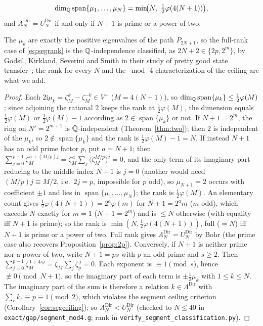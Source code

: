 \begin{theorem}\label{thm:segrank}
\begin{equation}\label{eq:segrank}
  \dim_\Q\operatorname{span}\{\mu_1,\dots,\mu_N\}=\min\!\bigl(N,\ \tfrac12\varphi(4(N+1))\bigr),
\end{equation}
and $A_N^{\mathrm{Dir}}=U_N^{\mathrm{Dir}}$ if and only if $N+1$ is prime or a power of two.
\end{theorem}

\noindent The $\mu_k$ are exactly the positive eigenvalues of the path $P_{2N+1}$, so the full-rank case of
\eqref{eq:segrank} is the $\mathbb{Q}$-independence classified, as $2N+2\in\{2p,2^m\}$, by Godsil, Kirkland, Severini and
Smith in their study of pretty good state transfer~\cite{GKSS12}; the rank for every $N$ and the $\bmod\,4$
characterization of the ceiling are what we add.

\begin{proof}
Each $2\mathrm i\mu_k=\zeta_M^k-\zeta_M^{-k}\in V^-$ ($M=4(N+1)$), so $\dim_{\mathbb{Q}}\operatorname{span}\{\mu_k\}\le\tfrac12\varphi(M)$;
since adjoining the rational $2$ keeps the rank at $\tfrac12\varphi(M)$, the dimension equals
$\tfrac12\varphi(M)$ or $\tfrac12\varphi(M)-1$ according as $2\in\operatorname{span}\{\mu_k\}$ or not.
If $N+1=2^m$, the ring on $N'=2^{m+1}$ is $\mathbb{Q}$-independent (Theorem~\ref{thm:two}); then $2$ is independent
of the $\mu_k$, so $2\notin\operatorname{span}\{\mu_k\}$ and the rank is $\tfrac12\varphi(M)-1=N$. If instead
$N+1$ has an odd prime factor $p$, put $a=N+1$; then
$\sum_{j=0}^{p-1}\zeta_M^{\,a+(M/p)j}=\zeta_M^{\,a}\sum_j\bigl(\zeta_M^{M/p}\bigr)^{j}=0$, and the only term of
its imaginary part reducing to the middle index $N+1$ is $j=0$ (another would need $(M/p)j\equiv M/2$, i.e.\
$2j=p$, impossible for $p$ odd), so $\mu_{N+1}=2$ occurs with coefficient $\pm1$ and lies in
$\operatorname{span}\{\mu_1,\dots,\mu_N\}$; the rank is $\tfrac12\varphi(M)$. An elementary count gives
$\tfrac12\varphi(4(N+1))=2^a\varphi(m)$ for $N+1=2^am$ ($m$ odd), which exceeds $N$ exactly for $m=1$
($N+1=2^m$) and is $\le N$ otherwise (with equality iff $N+1$ is prime); so the rank is
$\min(N,\tfrac12\varphi(4(N+1)))$, full ($=N$) iff $N+1$ is prime or a power of two. Full rank gives
$A_N^{\mathrm{Dir}}=U_N^{\mathrm{Dir}}$ by Bohr (the prime case also recovers Proposition~\ref{prop:2p}).
Conversely, if $N+1$ is neither prime nor a power of two, write $N+1=ps$ with $p$ an odd prime and $s\ge2$.
Then $\sum_{j=0}^{p-1}\zeta_M^{\,1+4sj}=\zeta_M\sum_j\zeta_p^{\,j}=0$. Each exponent is $\equiv1\pmod s$, hence
$\not\equiv0\pmod{N+1}$, so the imaginary part of each term is $\pm\tfrac12\mu_k$ with $1\le k\le N$. The
imaginary part of the sum is therefore a relation $k\in\Lambda^{\mathrm{Dir}}$ with
$\sum_rk_r\equiv p\equiv1\pmod2$, which violates the segment ceiling criterion
(Corollary~\ref{cor:segceiling}); so $A_N^{\mathrm{Dir}}<U_N^{\mathrm{Dir}}$ (checked to $N\le40$ in
\texttt{exact/gap/segment\_mod4.g}; rank in \texttt{verify\_segment\_classification.py}). \end{proof}

